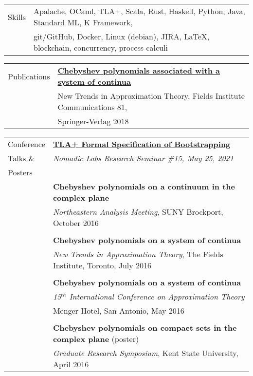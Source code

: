 \documentclass[letterpaper,10pt,oneside]{article}
\begin{document}
\noindent \begin{tabular}{@{} l l}
 \Large{Skills} & Apalache, OCaml, TLA+, Scala, Rust, Haskell, Python, Java, Standard ML, K Framework, \\
 \hspace{1.1in} & git/GitHub, Docker, Linux (debian), JIRA, \LaTeX, blockchain, concurrency, process calculi \\
\end{tabular}

\vfill

\noindent \begin{tabular}{@{} l l}
 \Large{Publications} & \href{https://link.springer.com/chapter/10.1007/978-1-4939-7543-3_7}{\textbf{Chebyshev polynomials associated with a system of continua}} \\
 \hspace{1.1in} & New Trends in Approximation Theory, Fields Institute Communications 81, \\
 & Springer-Verlag 2018 \\
\end{tabular}

\vfill

\noindent \begin{tabular}{@{} l l}
 \Large{Conference} & \href{https://www.youtube.com/watch?v=WgO2hHt2GrQ}{\textbf{TLA+ Formal Specification of Bootstrapping}} \\
 \Large{Talks \&} & \emph{Nomadic Labs Research Seminar \#15, May 25, 2021} \\
 \Large{Posters} & \\
 \hspace{1.1in} & \textbf{Chebyshev polynomials on a continuum in the complex plane}  \\
 & \emph{Northeastern Analysis Meeting}, SUNY Brockport, October 2016 \\
 & \\
 & \textbf{Chebyshev polynomials on a system of continua} \\
 & \emph{New Trends in Approximation Theory}, The Fields Institute, Toronto, July 2016 \\
 & \\
 & \textbf{Chebyshev polynomials on a system of continua} \\
 & \emph{15$^{th}$ International Conference on Approximation Theory} \\
 & Menger Hotel, San Antonio, May 2016 \\
 & \\
 & \textbf{Chebyshev polynomials on compact sets in the complex plane} (poster) \\
 & \emph{Graduate Research Symposium}, Kent State University, April 2016 \\
\end{tabular}
\end{document}
